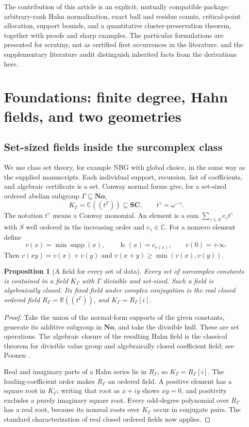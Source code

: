 \documentclass[11pt,letterpaper]{article}
\numberwithin{equation}{section}
\newtheorem{proposition}[proposition]{Proposition}
\theoremstyle{definition}
\theoremstyle{remark}
\newcommand{\No}{\mathbf{No}}
\newcommand{\SC}{\mathbf{SC}}
\newcommand{\C}{\mathbb C}
\newcommand{\R}{\mathbb R}
\newcommand{\supp}{\operatorname{supp}}
\newcommand{\lc}{\operatorname{lc}}
\begin{document}
The contribution of this article is an explicit, mutually compatible
package: arbitrary-rank Hahn normalization, exact ball and residue counts,
critical-point allocation, support bounds, and a quantitative
cluster-preservation theorem, together with proofs and sharp examples.
The particular formulations are presented for scrutiny, not as certified
first occurrences in the literature.  and the supplementary
literature audit distinguish inherited facts from the derivations here.

\section{Foundations: finite degree, Hahn fields, and two geometries}\label{sec:foundations}

\subsection{Set-sized fields inside the surcomplex class}
We use class set theory, for example NBG with global choice, in the same
way as the supplied manuscripts. Each individual support, recursion, list
of coefficients, and algebraic certificate is a set. Conway normal forms
give, for a set-sized ordered abelian subgroup $\Gamma\subseteq\No$,
\begin{equation}\label{eq:workspace}
 K_\Gamma=\C((t^\Gamma))\subseteq\SC,\qquad
 t^\gamma=\omega^{-\gamma}.
\end{equation}
The notation $t^\gamma$ means a Conway monomial. An element is a sum
$\sum_{\gamma\in S}c_\gamma t^\gamma$ with $S$ well ordered in the increasing
order and $c_\gamma\in\C$. For a nonzero element define
\[
 v(x)=\min\supp(x),\qquad \lc(x)=c_{v(x)},\qquad v(0)=+\infty.
\]
Then $v(xy)=v(x)+v(y)$ and $v(x+y)\ge\min(v(x),v(y))$.

\begin{proposition}[A field for every set of data]\label{prop:workspace}
Every set of surcomplex constants is contained in a field $K_\Gamma$ with
$\Gamma$ divisible and set-sized. Such a field is algebraically closed.
Its fixed field under complex conjugation is the real closed ordered
field $R_\Gamma=\R((t^\Gamma))$, and $K_\Gamma=R_\Gamma[i]$.
\end{proposition}
\begin{proof}
Take the union of the normal-form supports of the given constants,
generate its additive subgroup in $\No$, and take the divisible hull.
These are set operations. The algebraic closure of the resulting Hahn
field is the classical theorem for divisible value group and algebraically
closed coefficient field; see Poonen \cite[Corollary~4]{Poonen}.

Real and imaginary parts of a Hahn series lie in $R_\Gamma$, so
$K_\Gamma=R_\Gamma[i]$. The leading-coefficient order makes $R_\Gamma$ an
ordered field. A positive element has a square root in $K_\Gamma$; writing
that root as $x+iy$ shows $xy=0$, and positivity excludes a purely
imaginary square root. Every odd-degree polynomial over $R_\Gamma$ has a
real root, because its nonreal roots over $K_\Gamma$ occur in conjugate
pairs. The standard characterization of real closed ordered fields now
applies.
\end{proof}
\end{document}
